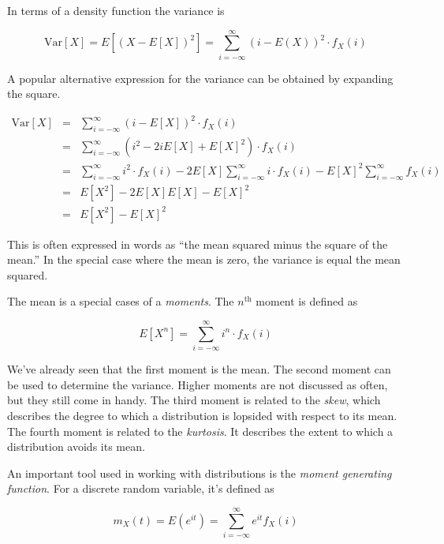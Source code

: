 \documentclass[]{article}
\begin{document}
In terms of a density function the variance is

\begin{equation} \label{discrete_var1}
\mbox{Var}[X] = E\left[(X - E[X])^2 \right]
     = \sum_{i = -\infty}^{\infty} (i - E(X))^2 \cdot f_X(i)
\end{equation}

A popular alternative expression for the variance can be
obtained by expanding the square.

\begin{eqnarray}
\mbox{Var}[X] & = & \sum_{i=-\infty}^{\infty} (i - E[X])^2 \cdot f_X(i) \nonumber \\
   & = & \sum_{i=-\infty}^{\infty} (i^2 - 2iE[X] + E[X]^2) \cdot f_X(i) \nonumber \\
   & = & \sum_{i=-\infty}^{\infty} i^2 \cdot f_X(i) 
       - 2E[X] \sum_{i=-\infty}^{\infty} i \cdot f_X(i)
       - E[X]^2 \sum_{i=-\infty}^{\infty} f_X(i) \nonumber \\
   & = & E[X^2] - 2E[X] E[X] - E[X]^2 \nonumber \\
   & = & E[X^2] - E[X]^2   \label{discrete_var2}
\end{eqnarray}

This is often expressed in words as ``the mean squared minus the
square of the mean.''  In the special case where the mean is zero,
the variance is equal the mean squared.

The mean is a special cases of a \emph{moments}.
The $n^{\mbox{th}}$ moment is defined as

$$
E[X^n] = \sum_{i = -\infty}^{\infty} i^n \cdot f_X(i)
$$

We've already seen that the first moment is the mean.
The second moment can be used to determine the variance.
Higher moments are not
discussed as often, but they still come in handy.  The
third moment is related to the \emph{skew}, which describes
the degree
to which a distribution is lopsided with respect to its
mean.  The fourth moment is related to the \emph{kurtosis}.  It
describes the extent to which a distribution avoids its mean.

An important tool used in working with distributions is the
\emph{moment generating function}.  For a discrete random
variable, it's defined as

\begin{equation} \label{discrete_mgf}
m_X(t) = E(e^{it}) = \sum_{i=-\infty}^{\infty} e^{it} f_X(i)
\end{equation}
\end{document}
